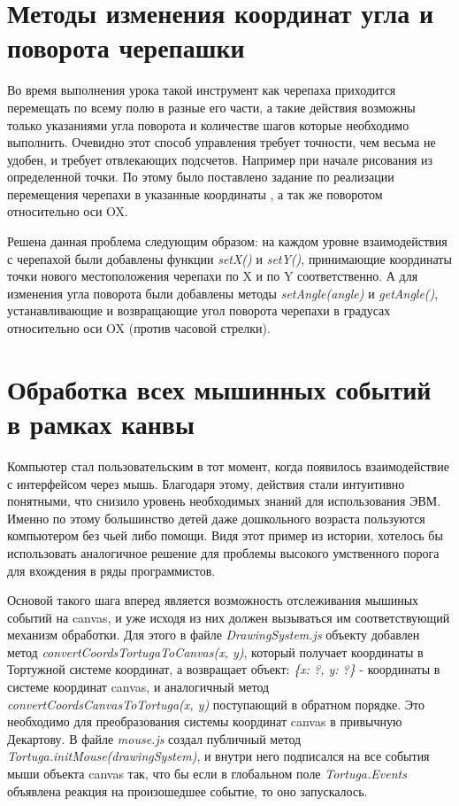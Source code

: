 \chapter{Методы изменения координат угла и поворота черепашки} \label{chapt1}
Во время выполнения урока такой инструмент как черепаха приходится перемещать по всему полю в разные его части, а такие действия возможны только указаниями угла поворота и количестве шагов которые необходимо выполнить. Очевидно этот способ управления требует точности, чем весьма не удобен, и требует отвлекающих подсчетов. Например при начале рисования из определенной точки. По этому было поставлено задание по реализации перемещения черепахи в указанные координаты , а так же поворотом относительно оси OX.

Решена данная проблема следующим образом: на каждом уровне взаимодействия с  черепахой были добавлены функции \textit{setX()} и \textit{setY()},  принимающие координаты точки нового местоположения черепахи по X и по Y  соответственно. А для изменения угла поворота были добавлены методы \textit{setAngle(angle)} и \textit{getAngle()}, устанавливающие и возвращающие угол поворота черепахи в градусах относительно оси OX (против часовой стрелки). 



\chapter{Обработка всех мышинных событий в рамках канвы} \label{chapt1}

Компьютер стал пользовательским в тот момент, когда появилось взаимодействие с интерфейсом через мышь. Благодаря этому, действия стали интуитивно понятными, что снизило уровень необходимых знаний для использования ЭВМ. Именно по этому большинство детей даже дошкольного возраста пользуются компьютером без чьей либо помощи. Видя этот пример из истории, хотелось бы использовать аналогичное решение для проблемы высокого умственного порога для вхождения в ряды программистов. 

Основой такого шага вперед является возможность отслеживания мышиных событий на canvas, и уже исходя из них должен вызываться им соответствующий механизм обработки. Для этого в файле \textit{DrawingSystem.js}  объекту добавлен  метод \textit{convertCoordsTortugaToCanvas(x, y)}, который получает координаты в Тортужной системе координат, а возвращает объект: \textit{\{x: ?, y: ?\}} - координаты в системе координат canvas, и аналогичный метод \textit{convertCoordsCanvasToTortuga(x, y)}  поступающий в обратном порядке. Это необходимо для  преобразования системы координат canvas  в привычную Декартову. В файле \textit{mouse.js} создал публичный метод \textit{Tortuga.initMouse(drawingSystem)}, и внутри него подписался на все события мыши объекта canvas так, что бы если в глобальном поле \textit{Tortuga.Events} объявлена реакция на произошедшее событие, то оно запускалось. 

